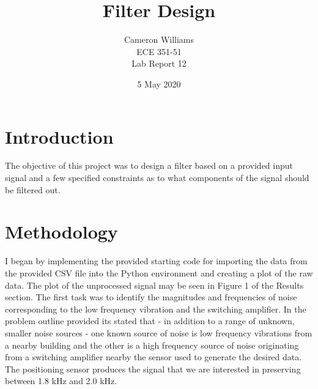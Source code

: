 \documentclass[12pt]{article}
\title{Filter Design}
\author{Cameron Williams\\ECE 351-51\\Lab Report 12}
\date{5 May 2020}
\begin{document}
\vspace{\fill}
\maketitle
\vspace{\fill}
\clearpage

\newpage
\section{Introduction}
    \par The objective of this project was to design a filter based on a provided input signal and a few specified constraints as to what components of the signal should be filtered out. 

\section{Methodology}
    \par I began by implementing the provided starting code for importing the data from the provided CSV file into the Python environment and creating a plot of the raw data. The plot of the unprocessed signal may be seen in Figure 1 of the Results section. The first task was to identify the magnitudes and frequencies of noise corresponding to the low frequency vibration and the switching amplifier. In the problem outline provided its stated that - in addition to a range of unknown, smaller noise sources - one known source of noise is low frequency vibrations from a nearby building and the other is a high frequency source of noise originating from a switching amplifier nearby the sensor used to generate the desired data. The positioning sensor produces the signal that we are interested in preserving between 1.8 kHz and 2.0 kHz.
    
\end{document}
